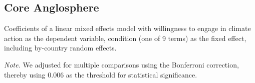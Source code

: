    \subsection{Core Anglosphere}

\begin{table}[H] 
\caption{Coefficients of a linear mixed effects model with willingness to engage in climate action as the dependent variable, condition (one of 9 terms) as the fixed effect, including by-country random effects.}
 
\end{table}
\textit{Note.} We adjusted for multiple comparisons using the Bonferroni correction, thereby using 0.006 as the threshold for statistical significance.